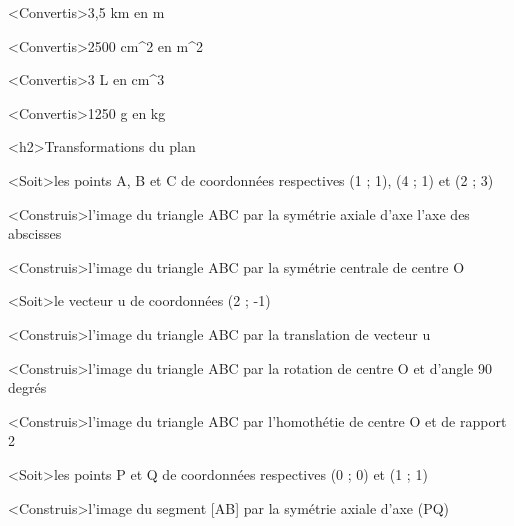 \documentclass[marges=20, taille=11, precision=3]{texecole}
\begin{document}
<Convertis>3,5 km en m

<Convertis>2500 cm^2 en m^2

<Convertis>3 L en cm^3

<Convertis>1250 g en kg


<h2>Transformations du plan

<Soit>les points A, B et C de coordonnées respectives (1 ; 1), (4 ; 1) et (2 ; 3)

<Construis>l'image du triangle ABC par la symétrie axiale d'axe l'axe des abscisses

<Construis>l'image du triangle ABC par la symétrie centrale de centre O

<Soit>le vecteur u de coordonnées (2 ; -1)

<Construis>l'image du triangle ABC par la translation de vecteur u

<Construis>l'image du triangle ABC par la rotation de centre O et d'angle 90 degrés

<Construis>l'image du triangle ABC par l'homothétie de centre O et de rapport 2

<Soit>les points P et Q de coordonnées respectives (0 ; 0) et (1 ; 1)

<Construis>l'image du segment [AB] par la symétrie axiale d'axe (PQ)
\end{document}
